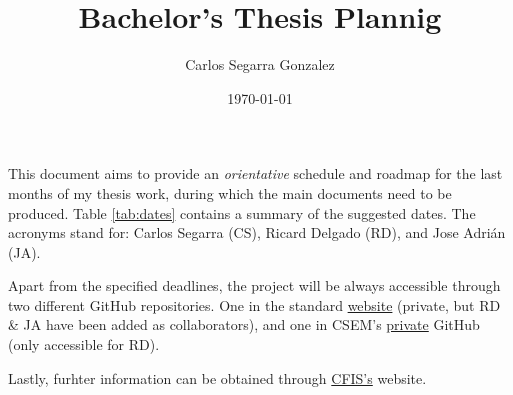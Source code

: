 \documentclass{article}
\begin{document}
\onehalfspacing

\title{Bachelor's Thesis Plannig}
\author{Carlos Segarra Gonzalez}
\date{\today}

\maketitle

This document aims to provide an \emph{orientative} schedule and roadmap for the last months of my thesis work, during which the main documents need to be produced. Table \ref{tab:dates} contains a summary of the suggested dates. The acronyms stand for: Carlos Segarra (CS), Ricard Delgado (RD), and Jose Adri\'an (JA).

Apart from the specified deadlines, the project will be always accessible through two different GitHub repositories. One in the standard \href{https://github.com/csegarragonz/thesis}{website} (private, but RD \& JA have been added as collaborators), and one in CSEM's \href{https://github.csem.local/cse/thesis}{private} GitHub (only accessible for RD).

Lastly, furhter information can be obtained through \href{https://cfis.upc.edu/ca/el-curs-actual/treballs-finals-de-grau/procediments-i-calendari-de-tfg}{CFIS's} website.
\end{document}
